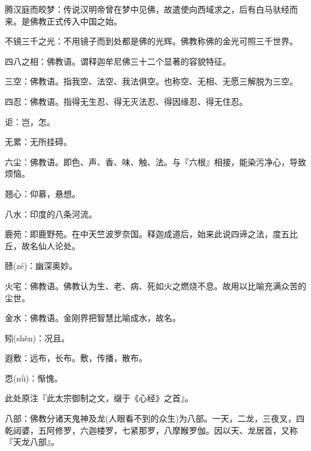 \startbuffer[2510]
腾汉庭而皎梦：传说汉明帝曾在梦中见佛，故遣使向西域求之，后有白马驮经而来。是佛教正式传入中国之始。
\stopbuffer


\startbuffer[2511]
不镜三千之光：不用镜子而到处都是佛的光辉。佛教称佛的金光可照三千世界。
\stopbuffer


\startbuffer[2512]
四八之相：佛教语。谓释迦牟尼佛三十二个显著的容貌特征。
\stopbuffer


\startbuffer[2513]
三空：佛教语。指我空、法空、我法俱空。也称空、无相、无愿三解脱为三空。
\stopbuffer


\startbuffer[2514]
四忍：佛教语。指得无生忍、得无灭法忍、得因缘忍、得无住忍。
\stopbuffer


\startbuffer[2515]
讵：岂，怎。
\stopbuffer


\startbuffer[2516]
无累：无所挂碍。
\stopbuffer


\startbuffer[2517]
六尘：佛教语。即色、声、香、味、触、法。与『六根』相接，能染污净心，导致烦恼。
\stopbuffer


\startbuffer[2518]
翘心：仰慕，悬想。
\stopbuffer


\startbuffer[2519]
八水：印度的八条河流。
\stopbuffer


\startbuffer[2520]
鹿苑：即鹿野苑。在中天竺波罗奈国。释迦成道后，始来此说四谛之法，度五比丘，故名仙人论处。
\stopbuffer


\startbuffer[2521]
赜(zé)：幽深奥妙。
\stopbuffer


\startbuffer[2522]
火宅：佛教语。佛教认为生、老、病、死如火之燃烧不息。故用以比喻充满众苦的尘世。
\stopbuffer


\startbuffer[2523]
金水：佛教语。金刚界把智慧比喻成水，故名。
\stopbuffer


\startbuffer[2524]
矧(shěn)：况且。
\stopbuffer


\startbuffer[2525]
遐敷：远布，长布。敷，传播，散布。
\stopbuffer


\startbuffer[2526]
恧(nǜ)：惭愧。
\stopbuffer


\startbuffer[2527]
此处原注『此太宗御制之文，缀于《心经》之首』。
\stopbuffer


\startbuffer[2528]
八部：佛教分诸天鬼神及龙(人眼看不到的众生)为八部。一天，二龙，三夜叉，四乾闼婆，五阿修罗，六迦楼罗，七紧那罗，八摩睺罗伽。因以天、龙居首，又称『天龙八部』。
\stopbuffer
